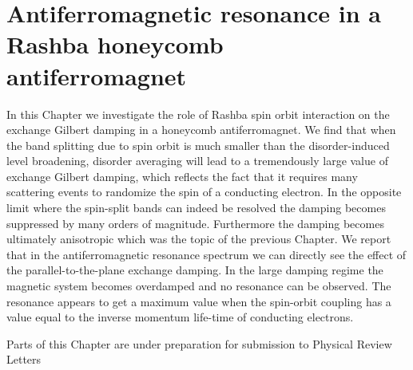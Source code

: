 \chapter{Antiferromagnetic resonance in a Rashba honeycomb antiferromagnet} %
\label{ch:robert}
In this Chapter we investigate the role of Rashba spin orbit interaction on the exchange Gilbert damping in a honeycomb antiferromagnet. We find that when the band splitting due to spin orbit is much smaller than the disorder-induced level broadening, disorder averaging will lead to a tremendously large value of exchange Gilbert damping, which reflects the fact that it requires many scattering events to randomize the spin of a conducting electron. In the opposite limit where the spin-split bands can indeed be resolved the damping becomes suppressed by many orders of magnitude. Furthermore the damping becomes ultimately anisotropic which was the topic of the previous Chapter. We report that in the antiferromagnetic resonance spectrum we can directly see the effect of the parallel-to-the-plane exchange damping. In the large damping regime the magnetic system becomes overdamped and no resonance can be observed. The resonance appears to get a maximum value when the spin-orbit coupling has a value equal to the inverse momentum life-time of conducting electrons. 

\vfill
Parts of this Chapter are under preparation for submission to Physical Review Letters\clearpage




